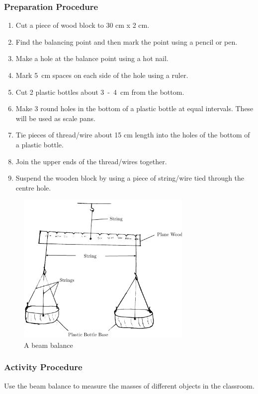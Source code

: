\subsubsection*{Preparation Procedure}
\begin{enumerate}
\item{Cut a piece of wood block to 30 cm x 2 cm.} 
\item{Find the balancing point and then mark the point using a pencil or pen.} 
\item{Make a hole at the balance point using a hot nail.} 
\item{Mark 5~cm spaces on each side of the hole using a ruler.} 
\item{Cut 2 plastic bottles about 3~-~4~cm from the bottom.} 
\item{Make 3 round holes in the bottom of a plastic bottle at equal intervals. These will be used as scale pans.} 
\item{Tie pieces of thread/wire about 15 cm length into the holes of the bottom of a plastic bottle.} 
\item{Join the upper ends of the thread/wires together.} 
\item{Suspend the wooden block by using a piece of string/wire tied through the centre hole.} 
\end{enumerate}

\begin{figure}
\begin{center}
\includegraphics{./img/beam-balance.png}
\caption{A beam balance}
\label{fig:beam-balance}
\end{center}
\end{figure}

\subsubsection*{Activity Procedure}
Use the beam balance to measure the masses of different objects in the classroom.


